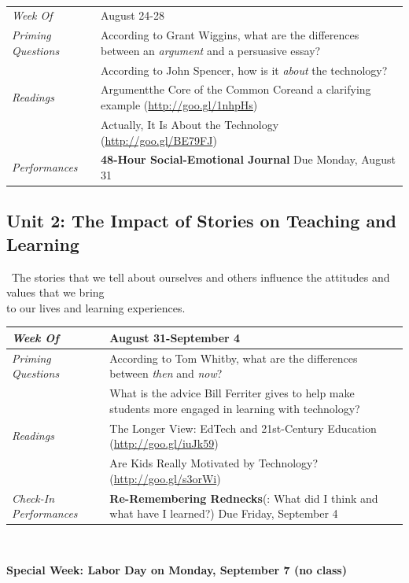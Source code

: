 \documentclass{tufte-handout}
\newcommand{\gentopic}[1]{\begin{fullwidth}\begin{center}\faKey~\textsf{#1}\end{center}\end{fullwidth}}
\newcommand{\tabpq}{\faQuestionSign\medspace\textit{Priming Questions}}
\newcommand{\tabread}{\faBook\medspace\textit{Readings}}
\newcommand{\tabperformance}{\faTasks\medspace\textit{Performances}}
\newcommand{\tabdt}{\faCalendar\medspace\textit{Week Of}}
\newcommand{\tabcheckin}{\faPagelines\medspace\textit{Check-In Performances}}
\newcommand{\tabbreak}{\begin{fullwidth}\begin{center}\faAsterisk\faAsterisk\faAsterisk\\\end{center}\end{fullwidth}}
\newcommand{\specialweek}[1]{\begin{fullwidth}\begin{center}\textbf{\faBullhorn\medspace Special Week: #1 \medspace\faBullhorn}\end{center}\end{fullwidth}}
\newenvironment{tabsched}
	{\small
	\begin{tabular}{p{1.5in}p{4.5in}}
	\midrule}
	{\midrule
	\end{tabular}
	\normalsize}
\newcommand{\weektwo}{August 24-28}
\newcommand{\weekthree}{August 31-September 4}
\newcommand{\laborday}{Labor Day on Monday, September 7 (no class)}
\begin{document}
\tabbreak

\begin{tabsched}
	\tabdt & \weektwo \\
	\midure
	\tabpq & According to Grant Wiggins, what are the differences between an \emph{argument} and a persuasive essay? \\
	& According to John Spencer, how is it \emph{about} the technology? \\
	\midrule
	\tabread & Argument\textemdash{}the Core of the Common Core\textemdash{}and a clarifying example (\url{http://goo.gl/1nhpHs}) \\
	& Actually, It Is About the Technology (\url{http://goo.gl/BE79FJ}) \\
	\midrule
	\tabperformance & \textbf{48-Hour Social-Emotional Journal} Due Monday, August 31 \\
\end{tabsched}

\begin{fullwidth}
	\section{Unit 2: The Impact of Stories on Teaching and Learning}
\end{fullwidth}

\gentopic{The stories that we tell about ourselves and others influence the attitudes and values that we bring\\to our lives and learning experiences.}

\begin{tabsched}
	\tabdt & \weekthree \\
	\midrule
	\tabpq & According to Tom Whitby, what are the differences between \textit{then} and \textit{now}? \\
	& What is the advice Bill Ferriter gives to help make students more engaged in learning with technology? \\
	\midrule
	\tabread & The Longer View: EdTech and 21st-Century Education (\url{http://goo.gl/iuJk59}) \\
	& Are Kids Really Motivated by Technology? (\url{http://goo.gl/s3orWi}) \\
	\midrule
	\tabcheckin & \textbf{Re-Remembering Rednecks}(: What did I think and what have I learned?) Due Friday, September 4 \\
\end{tabsched}

\tabbreak

\specialweek{\laborday}
\end{document}
